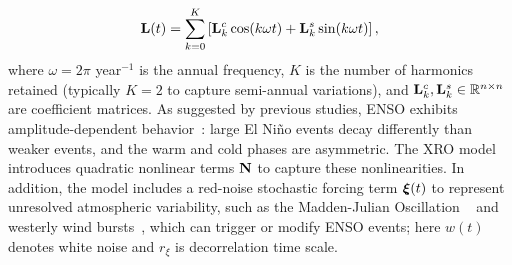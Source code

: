 \begin{equation}
    \mathbf{L}(t) = \sum_{k=0}^{K} \left[ \mathbf{L}_k^c \cos(k\omega t) + \mathbf{L}_k^s \sin(k\omega t) \right],
    \label{eq:seasonal_L}
\end{equation}
where $\omega = 2\pi$ year$^{-1}$ is the annual frequency, $K$ is the number of harmonics retained (typically $K=2$ to capture semi-annual variations), and $\mathbf{L}_k^c, \mathbf{L}_k^s \in \mathbb{R}^{n \times n}$ are coefficient matrices. As  suggested by previous studies, ENSO exhibits amplitude-dependent behavior~\cite{an2004nonlinearity}: large El Ni\~no events decay differently than weaker events, and the warm and cold phases are asymmetric. The XRO model introduces quadratic nonlinear terms $\mathbf{N}$ to capture these nonlinearities. In addition, the model includes a red-noise stochastic forcing term $\boldsymbol{\xi}(t)$ to represent unresolved atmospheric variability, such as the Madden-Julian Oscillation ~\cite{madden1971detection,zhang2005mjo} and westerly wind bursts~\cite{harrison1997westerly}, which can trigger or modify ENSO events; here $w(t)$ denotes white noise and $r_\xi$ is decorrelation time scale.



